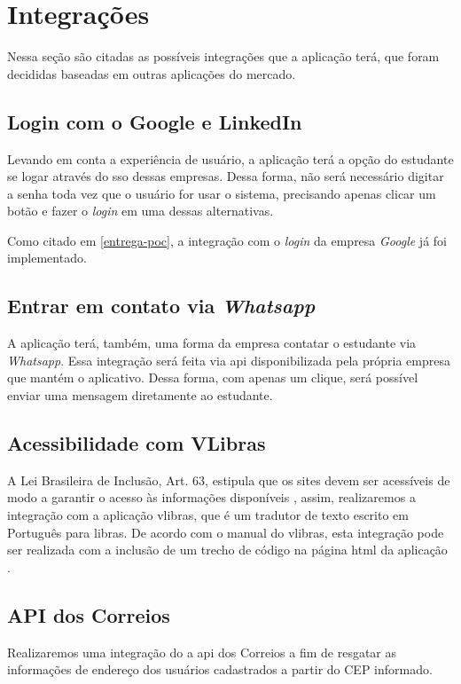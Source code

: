 \section{Integrações}
Nessa seção são citadas as possíveis integrações que a aplicação terá, que foram decididas baseadas em outras aplicações do mercado.

\subsection{Login com o Google e LinkedIn}
Levando em conta a experiência de usuário, a aplicação terá a opção do estudante se logar através do \ac{sso} dessas empresas. Dessa forma, não será necessário digitar a senha toda vez que o usuário for usar o sistema, precisando apenas clicar um botão e fazer o \textit{login} em uma dessas alternativas.

Como citado em \autoref{entrega-poc}, a integração com o \textit{login} da empresa \textit{Google} já foi implementado.

\subsection{Entrar em contato via \textit{Whatsapp}}
A aplicação terá, também, uma forma da empresa contatar o estudante via \textit{Whatsapp}. Essa integração será feita via \ac{api} disponibilizada pela própria empresa que mantém o aplicativo. Dessa forma, com apenas um clique, será possível enviar uma mensagem diretamente ao estudante.

\subsection{Acessibilidade com VLibras}
A Lei Brasileira de Inclusão, Art. 63, estipula que os sites devem ser acessíveis de modo a garantir o acesso às informações disponíveis \cite{leiinclusao}, assim, realizaremos a integração com a aplicação \gls{vlibras}, que é um tradutor de texto escrito em Português para \ac{libras}. De acordo com o manual do \gls{vlibras}, esta integração pode ser realizada com a inclusão de um trecho de código na página \ac{html} da aplicação \cite{manualvlibras}.

\subsection{API dos Correios}
Realizaremos uma integração do a \ac{api} dos Correios a fim de resgatar as informações de endereço dos usuários cadastrados a partir do CEP informado.